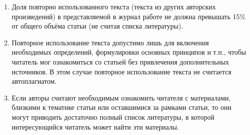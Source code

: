 \begin{enumerate}

\item[1.] 

Доля повторно использованного текста (текста из других авторских произведений) в представляемой в журнал работе не должна превышать 15\% от общего объёма статьи (не считая списка литературы).

\item[2.]

Повторное использование текста допустимо лишь для включения необходимых определений, формулировки основных принципов и т.п., чтобы читатель мог ознакомиться со статьей без привлечения дополнительных источников. В этом случае повторное использование текста не считается автоплагиатом.

\item[3.]

Если авторы считают необходимым ознакомить читателя с материалами, близкими к тематике статьи или оставшимися за рамками статьи, то они могут приводить достаточно полный список литературы, в которой интересующийся читатель может найти эти материалы.

\end{enumerate}



%


